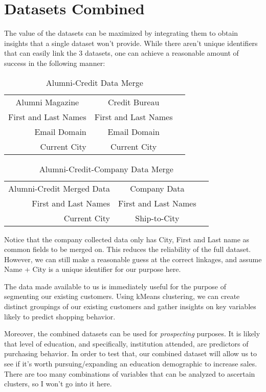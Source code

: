 \documentclass[letterpaper,12pt]{article}
\begin{document}
\section{Datasets Combined}
The value of the datasets can be maximized by integrating them to obtain insights that a single dataset won't provide.  While there aren't unique identifiers that can easily link the 3 datasets, one can achieve a reasonable amount of success in the following manner:

\begin{table}
  \caption{Alumni-Credit Data Merge}
  \centering
  \begin{tabular}{ |r|c|c|}
    \multicolumn{1}{c}{Alumni Magazine}
    &  \multicolumn{1}{c}{Credit Bureau} \\
    \cline{1-2}
    First and Last Names & First and Last Names \\
    \cline{1-2}
    Email Domain & Email Domain \\
    \cline{1-2}
    Current City & Current City \\
    \cline{1-2}
  \end{tabular}
\end{table}

\begin{table}
  \caption{Alumni-Credit-Company Data Merge}
  \centering
  \begin{tabular}{ |r|c|c|}
    \multicolumn{1}{c}{Alumni-Credit Merged Data}
    &  \multicolumn{1}{c}{Company Data} \\
    \cline{1-2}
    First and Last Names & First and Last Names \\
    \cline{1-2}
    Current City & Ship-to-City \\
    \cline{1-2}
  \end{tabular}
\end{table}

Notice that the company collected data only has City, First and Last name as common fields to be merged on.  This reduces the reliability of the full dataset.  However, we can still make a reasonable guess at the correct linkages, and assume Name + City is a unique identifier for our purpose here.

The data made available to us is immediately useful for the purpose of segmenting our existing customers.  Using kMeans clustering, we can create distinct groupings of our existing customers and gather insights on key variables likely to predict shopping behavior.

Moreover, the combined datasets can be used for \emph{prospecting} purposes.  It is likely that level of education, and specifically, institution attended, are predictors of purchasing behavior.  In order to test that, our combined dataset will allow us to see if it's worth pursuing/expanding an education demographic to increase sales.  There are too many combinations of variables that can be analyzed to ascertain clusters, so I won't go into it here.
\end{document}
